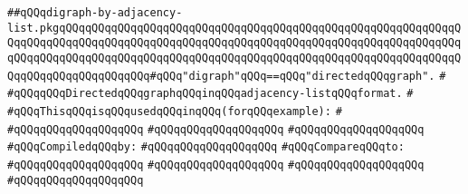 \label{src/lib/graph/digraph-by-adjacency-list.pkg}
\verb|##qQQqdigraph-by-adjacency-list.pkgqQQqqQQqqQQqqQQqqQQqqQQqqQQqqQQqqQQqqQQqqQQqqQQqqQQqqQQqqQQqqQQqqQQqqQQqqQQqqQQqqQQqqQQqqQQqqQQqqQQqqQQqqQQqqQQqqQQqqQQqqQQqqQQqqQQqqQQqqQQqqQQqqQQqqQQqqQQqqQQqqQQqqQQqqQQqqQQqqQQqqQQqqQQqqQQqqQQqqQQqqQQqqQQqqQQqqQQqqQQqqQQq#qQQq"digraph"qQQq==qQQq"directedqQQqgraph".|\newline
\verb|#|\newline
\verb|#qQQqqQQqDirectedqQQqgraphqQQqinqQQqadjacency-listqQQqformat.|\newline
\verb|#|\newline
\verb|#qQQqThisqQQqisqQQqusedqQQqinqQQq(forqQQqexample):|\newline
\verb|#|\newline
\verb|#qQQqqQQqqQQqqQQqqQQq|\newline
\verb|#qQQqqQQqqQQqqQQqqQQq|\newline
\verb|#qQQqqQQqqQQqqQQqqQQq|\newline
\newline
\verb|#qQQqCompiledqQQqby:|\newline
\verb|#qQQqqQQqqQQqqQQqqQQq|\newline
\newline
\verb|#qQQqCompareqQQqto:|\newline
\verb|#qQQqqQQqqQQqqQQqqQQq|\newline
\verb|#qQQqqQQqqQQqqQQqqQQq|\newline
\verb|#qQQqqQQqqQQqqQQqqQQq|\newline
\verb|#qQQqqQQqqQQqqQQqqQQq|\newline
\newline
\newline
\newline
